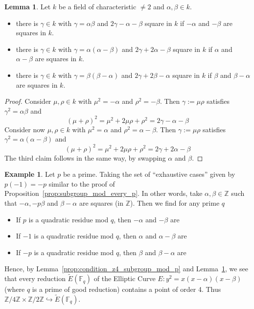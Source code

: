 \documentclass{scrartcl}
\newcommand{\Z}{\mathbb{Z}}
\newcommand{\F}{\mathbb{F}}
\theoremstyle{definition}
\newtheorem{lemma}[subsection]{Lemma}
\newtheorem{example}[subsection]{Example}
\begin{document}
\begin{lemma}
    \label{prop:condition_double_square}
    Let $k$ be a field of characteristic $\neq 2$ and $\alpha, \beta \in k$.
    \begin{itemize}
        \item there is $\gamma \in k$ with $\gamma = \alpha\beta$ and $2\gamma - \alpha - \beta$ square in $k$ if $-\alpha$ and $-\beta$ are squares in $k$.
        \item there is $\gamma \in k$ with $\gamma = \alpha(\alpha - \beta)$ and $2\gamma + 2\alpha - \beta$ square in $k$ if $\alpha$ and $\alpha - \beta$ are squares in $k$.
        \item there is $\gamma \in k$ with $\gamma = \beta(\beta - \alpha)$ and $2\gamma + 2\beta - \alpha$ square in $k$ if $\beta$ and $\beta - \alpha$ are squares in $k$.
    \end{itemize}
\end{lemma}
\begin{proof}
    Consider $\mu, \rho \in k$ with $\mu^2 = -\alpha$ and $\rho^2 = -\beta$.
    Then $\gamma := \mu\rho$ satisfies $\gamma^2 = \alpha\beta$ and
    \begin{equation*}
        (\mu + \rho)^2 = \mu^2 + 2\mu\rho + \rho^2 = 2\gamma -\alpha - \beta
    \end{equation*}
    Consider now $\mu, \rho \in k$ with $\mu^2 = \alpha$ and $\rho^2 = \alpha - \beta$.
    Then $\gamma := \mu\rho$ satisfies $\gamma^2 = \alpha(\alpha - \beta)$ and
    \begin{equation*}
        (\mu + \rho)^2 = \mu^2 + 2\mu\rho + \rho^2 = 2\gamma + 2\alpha - \beta
    \end{equation*}
    The third claim follows in the same way, by swapping $\alpha$ and $\beta$.
\end{proof}
\begin{example}
    Let $p$ be a prime.
    Taking the set of ``exhaustive cases'' given by $p(-1) = -p$ similar to the proof of Proposition~\ref{prop:subgroup_mod_every_p}.
    In other words, take $\alpha, \beta \in \Z$ such that $-\alpha, -p\beta$ and $\beta - \alpha$ are squares (in $\Z$).
    Then we find for any prime $q$
    \begin{itemize}
        \item If $p$ is a quadratic residue mod $q$, then $-\alpha$ and $-\beta$ are
        \item If $-1$ is a quadratic residue mod $q$, then $\alpha$ and $\alpha - \beta$ are
        \item If $-p$ is a quadratic residue mod $q$, then $\beta$ and $\beta - \alpha$ are
    \end{itemize}
    Hence, by Lemma~\ref{prop:condition_z4_subgroup_mod_p} and Lemma~\ref{prop:condition_double_square}, we see that every reduction $\tilde{E}(\F_q)$ of the Elliptic Curve $E: y^2 = x(x - \alpha)(x - \beta)$ (where $q$ is a prime of good reduction) contains a point of order 4.
    Thus $\Z/4\Z \times \Z/2\Z \hookrightarrow \tilde{E}(\F_q)$.
\end{example}
\end{document}
